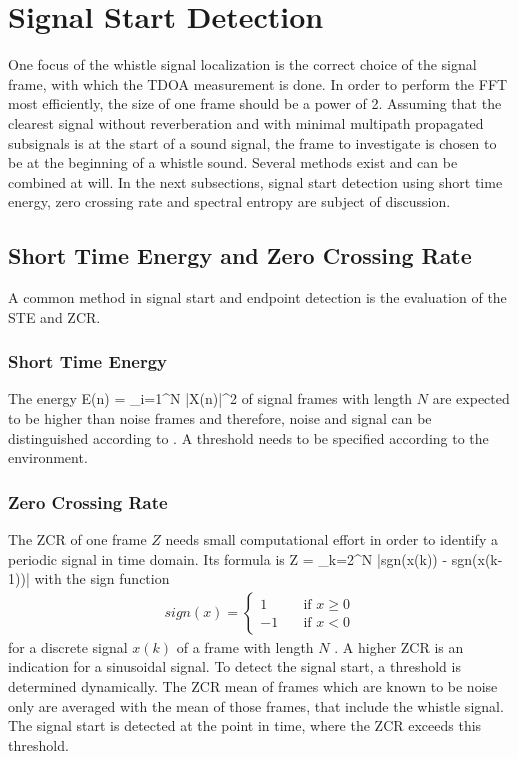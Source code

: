 \section{Signal Start Detection}
\label{sec:02_signalStartDetection}

One focus of the whistle signal localization is the correct choice of the
signal frame, with which the \ac{TDOA} measurement is done.
In order to perform the \ac{FFT} most efficiently, the size of one frame
should be a power of 2.
Assuming that the clearest signal without reverberation and with minimal
multipath propagated subsignals is at the start of a sound signal,
the frame to investigate is chosen to be at the beginning of a whistle sound.
Several methods exist and can be combined at will.
In the next subsections, signal start detection using short time energy,
zero crossing rate and spectral entropy are subject of discussion.

\subsection{Short Time Energy and Zero Crossing Rate}

A common method in signal start and endpoint detection is the evaluation
of the \ac{STE} and \ac{ZCR}.

\subsubsection{Short Time Energy}
The energy
\bal
    E(n) = \sum_{i=1}^N |X(n)|^2
    \label{eq:02_energy}
\eal
of signal frames with length $N$ are expected to be higher than noise frames
and therefore, noise and signal can be distinguished
according to \cite{Z_W_voiceActivity}.
A threshold needs to be specified according to the environment.

\subsubsection{Zero Crossing Rate}

The \ac{ZCR} of one frame $Z$ needs small computational effort in order to
identify a periodic signal in time domain.
Its formula is
\bal
    Z = \sum_{k=2}^N |sgn(x(k)) - sgn(x(k-1))|
    \label{eq:02_zcr}
\eal
with the sign function
\begin{align*}
    sign(x) =
    \begin{cases}
        1 & \quad \text{if } x\geq 0 \\
        -1 & \quad \text{if } x < 0
    \end{cases}
\end{align*}
for a discrete signal $x(k)$ of a frame with length $N$ \cite{Z_W_voiceActivity}.
A higher \ac{ZCR} is an indication for a sinusoidal signal.
To detect the signal start, a threshold is determined dynamically.
The \ac{ZCR} mean of frames which are known to be noise only
are averaged with the mean of those frames, that include the whistle signal.
The signal start is detected at the point in time, where the \ac{ZCR} exceeds
this threshold.

